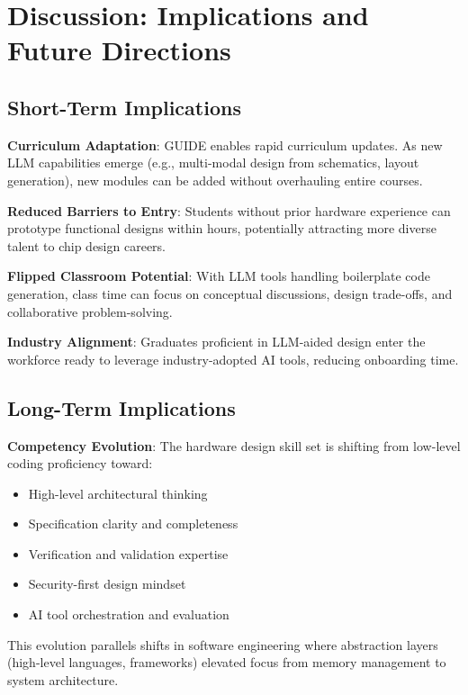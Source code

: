 \documentclass[10pt,conference]{IEEEtran}
\begin{document}
\section{Discussion: Implications and Future Directions}
\label{sec:discussion}

\subsection{Short-Term Implications}

\textbf{Curriculum Adaptation}: GUIDE enables rapid curriculum updates. As new LLM capabilities emerge (e.g., multi-modal design from schematics, layout generation), new modules can be added without overhauling entire courses.

\textbf{Reduced Barriers to Entry}: Students without prior hardware experience can prototype functional designs within hours, potentially attracting more diverse talent to chip design careers.

\textbf{Flipped Classroom Potential}: With LLM tools handling boilerplate code generation, class time can focus on conceptual discussions, design trade-offs, and collaborative problem-solving.

\textbf{Industry Alignment}: Graduates proficient in LLM-aided design enter the workforce ready to leverage industry-adopted AI tools, reducing onboarding time.

\subsection{Long-Term Implications}

\textbf{Competency Evolution}: The hardware design skill set is shifting from low-level coding proficiency toward:
\begin{itemize}
    \item High-level architectural thinking
    \item Specification clarity and completeness
    \item Verification and validation expertise
    \item Security-first design mindset
    \item AI tool orchestration and evaluation
\end{itemize}

This evolution parallels shifts in software engineering where abstraction layers (high-level languages, frameworks) elevated focus from memory management to system architecture.
\end{document}
